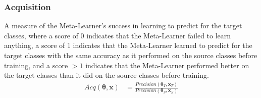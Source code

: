 \documentclass{report}
\begin{document}
\subsubsection{Acquisition}
A measure of the Meta-Learner's success in learning to predict for the target classes, where a score of 0 indicates that the Meta-Learner failed to learn anything, a score of 1 indicates that the Meta-Learner learned to predict for the target classes with the same accuracy as it performed on the source classes before training, and a score $>1$ indicates that the Meta-Learner performed better on the target classes than it did on the source classes before training.
\begin{align}
Acq(\bm{\theta}, \bm{x}) &= \frac{Precision(\bm{\theta}_T, \bm{x}_T)}{ Precision(\bm{\theta}_S, \bm{x}_S)}
\end{align}
\end{document}
